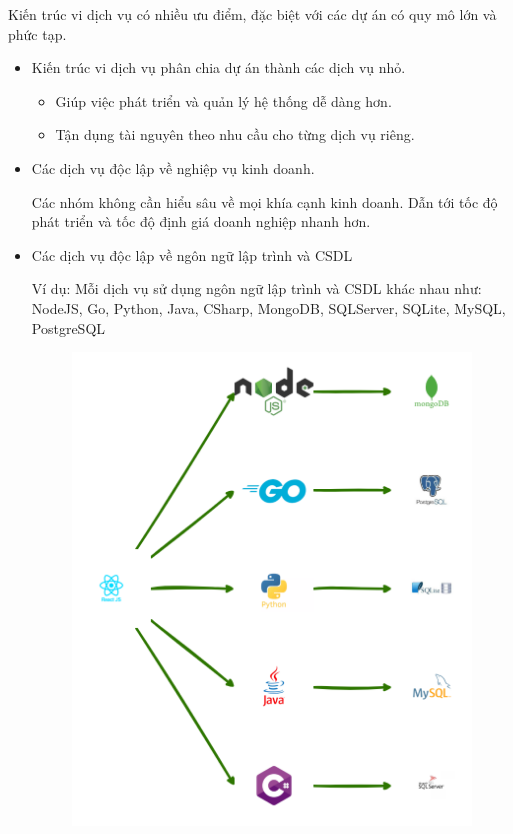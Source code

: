 Kiến trúc vi dịch vụ có nhiều ưu điểm, đặc biệt với các dự án có quy mô lớn và phức tạp.

\begin{itemize}

\item Kiến trúc vi dịch vụ phân chia dự án thành các dịch vụ nhỏ.

\begin{itemize}

\item Giúp việc phát triển và quản lý hệ thống dễ dàng hơn.

\item Tận dụng tài nguyên theo nhu cầu cho từng dịch vụ riêng.

\end{itemize}

\item Các dịch vụ độc lập về nghiệp vụ kinh doanh.

Các nhóm không cần hiểu sâu về mọi khía cạnh kinh doanh. Dẫn tới tốc độ phát triển và tốc độ định giá doanh nghiệp nhanh hơn.

\item Các dịch vụ độc lập về ngôn ngữ lập trình và CSDL

Ví dụ: Mỗi dịch vụ sử dụng ngôn ngữ lập trình và CSDL khác nhau như: NodeJS, Go, Python, Java, CSharp, MongoDB, SQLServer, SQLite, MySQL, PostgreSQL

\begin{figure}[H]

\centering

\includegraphics[scale = 0.3]{pictures/_da_ngon_ngu_va_csdl/main.drawio.png}


\end{figure}
\end{itemize}
